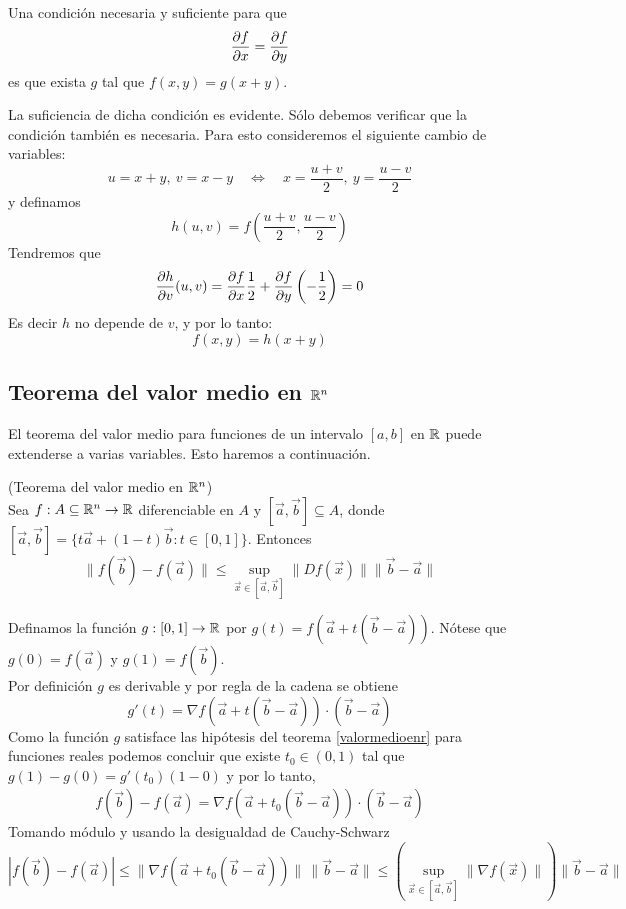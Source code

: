\begin{teorema}
Una condici\'on necesaria y suficiente para que
$$\frac{\partial f}{\partial x}=\frac{\partial f}{\partial y}$$ 
es que exista $g$ tal que $f(x,y)=g(x+y)$. 
\end{teorema}
\begin{demostracion}
La suficiencia de dicha condici\'on
es evidente. S\'olo debemos verificar que la condici\'on tambi\'en es necesaria. Para esto consideremos el siguiente cambio de variables:
$$u=x+y,\:v=x-y \quad \Leftrightarrow \quad x=\frac{u+v}{2},\: y=\frac{u-v}{2}$$
y definamos $$h(u,v)=f\left(\frac{u+v}{2},\frac{u-v}{2}\right)$$
Tendremos que
$$\frac{\partial h}{\partial v}(u,v)=\frac{\partial f}{\partial x}\frac{1}{2}+\frac{\partial f}{\partial y}\left(-\frac{1}{2}\right)=0$$
Es decir $h$ no depende de $v$, y por lo tanto:
$$f(x,y)=h(x+y)$$
\end{demostracion}

\subsection{Teorema del valor medio en \texorpdfstring{$\mathbb{R}^n$}{Rn}} 

El teorema del valor medio para funciones de un intervalo $[a,b]$ en $\mathbb{R}$
puede extenderse a varias variables. Esto haremos a continuaci\'on.
\begin{teorema}{\rm (Teorema del valor medio en $\mathbb{R}^n$)}\label{valormedio}
\\Sea $f:A\subseteq \mathbb{R}^n \to \mathbb{R}$ diferenciable en $A$ y $[\vec{a},\vec{b}]\subseteq A$, donde 
$[\vec{a},\vec{b}]=\{t\vec{a}+(1-t)\vec{b} : t\in [0,1]\}$. Entonces
$$\|f(\vec{b})-f(\vec{a})\|\leq \sup_{\vec{x}\in [\vec{a},\vec{b}]}\|Df(\vec{x})\|\|\vec{b}-\vec{a}\|$$
\end{teorema}

\begin{demostracion}
Definamos la funci\'on $g:[0,1]\to \mathbb{R}$ por $g(t)=f(\vec{a}+t(\vec{b}-\vec{a}))$. N\'otese que $g(0)=f(\vec{a})$ y $g(1)=f(\vec{b})$.
\\Por definici\'on $g$ es derivable y por regla de la cadena se obtiene
$$g'(t)=\nabla f(\vec{a}+t(\vec{b}-\vec{a}))\cdot (\vec{b}-\vec{a})$$
Como la funci\'on  $g$ satisface las hip\'otesis del teorema \ref{valormedioenr} para funciones reales podemos concluir que existe $t_0\in(0,1)$ tal que $g(1)-g(0)=g'(t_0)(1-0)$ y por lo tanto,
\begin{gather}\label{tvm2}
f(\vec{b})-f(\vec{a})=\nabla f(\vec{a}+t_0(\vec{b}-\vec{a}))\cdot(\vec{b}-\vec{a}) \tag{*}
\end{gather}
Tomando m\'odulo y usando la desigualdad de Cauchy-Schwarz
$$|f(\vec{b})-f(\vec{a})|\leq \|\nabla f(\vec{a}+t_0(\vec{b}-\vec{a}))\|\,\|\vec{b}-\vec{a}\|\leq \left(\sup_{\vec{x}\in [\vec{a},\vec{b}]}\|\nabla f(\vec{x})\|\right)\|\vec{b}-\vec{a}\|$$
\end{demostracion}

